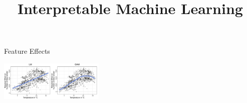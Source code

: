 \documentclass[11pt,compress,t,notes=noshow, aspectratio=169, xcolor=table]{beamer}
\title{Interpretable Machine Learning}
\date{}
\begin{document}
\newcommand{\titlefigure}{figure/feature-effect}
\newcommand{\learninggoals}{
\item Intro to feature effects
\item ICE plots
}


\begin{frame}{Feature Effects}





\centering

\includegraphics[width=0.375\textwidth, trim=0cm 0.1cm 10.4cm 0cm, clip]{figure/lm_main_effects}


\end{frame}
\end{document}

